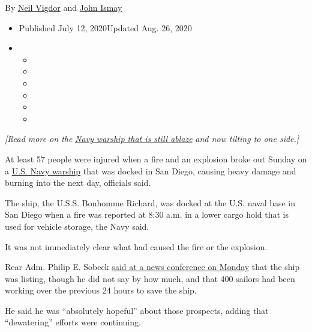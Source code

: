 By \href{https://www.nytimes3xbfgragh.onion/by/neil-vigdor}{Neil Vigdor}
and \href{https://www.nytimes3xbfgragh.onion/by/john-ismay}{John Ismay}

\begin{itemize}
\item
  Published July 12, 2020Updated Aug. 26, 2020
\item
  \begin{itemize}
  \item
  \item
  \item
  \item
  \item
  \item
  \end{itemize}
\end{itemize}

\emph{{[}Read more on the}
\href{https://www.nytimes3xbfgragh.onion/2020/07/13/us/naval-ship-fire-san-diego.html}{\emph{Navy
warship that is still ablaze}} \emph{and now tilting to one side.{]}}

At least 57 people were injured when a fire and an explosion broke out
Sunday on a
\href{https://www.nytimes3xbfgragh.onion/2020/08/26/us/bonhomme-richard-arson-fire.html}{U.S.
Navy warship} that was docked in San Diego, causing heavy damage and
burning into the next day, officials said.

The ship, the U.S.S. Bonhomme Richard, was docked at the U.S. naval base
in San Diego when a fire was reported at 8:30 a.m. in a lower cargo hold
that is used for vehicle storage, the Navy said.

It was not immediately clear what had caused the fire or the explosion.

Rear Adm. Philip E. Sobeck
\href{https://www.facebookcorewwwi.onion/SurfaceWarriors/videos/2713973245550040/?__xts__\%5B0\%5D=68.ARBncjWQcC-BIBJ7BLcf6xp8GVwwqvxHmXAeYTYmawWEs0ib9dLS7PZGyOPW96yBSRYJjYQzCB7QjxqEWK15yeoJPNogUx_T572RzKgVWFegU4V5WKjsPQ7Dp-JfyO05yUZfXJnoGGp-vIhu_SqIiUVLhkQncsM1IR-APVF_lR4CQvc4MX6YKpnet-EBocLNqwhctd6mCFZgnkx-n9DIvsrBte_0YvcEWC5dpN-OuBXI7bpA23vIgDYwijEW1dpkoQQD_3TQRcwPk7Rsoe4wsEplReyr4CIv4-O5SskoWnxyGBtCr6TG1kSavnDwmJhlLz2v77MZcaVqnoLp4t2bvrW5B1gKtQ\&__tn__=-R}{said
at a news conference on Monday} that the ship was listing, though he did
not say by how much, and that 400 sailors had been working over the
previous 24 hours to save the ship.

He said he was ``absolutely hopeful'' about those prospects, adding that
``dewatering'' efforts were continuing.

